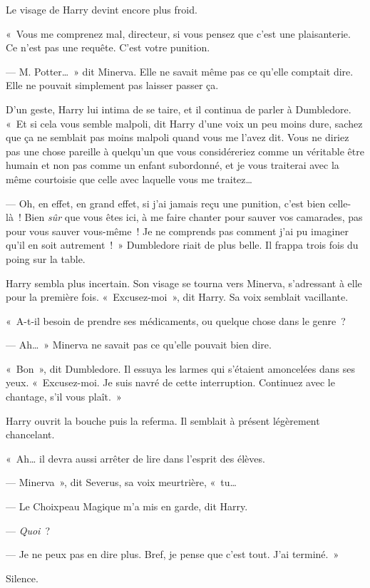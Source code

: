 Le visage de Harry devint encore plus froid.

«~Vous me comprenez mal, directeur, si vous pensez que c'est une plaisanterie.
Ce n'est pas une requête.
C'est votre punition.

--- M. Potter…~»
dit Minerva.
Elle ne savait même pas ce qu'elle comptait dire.
Elle ne pouvait simplement pas laisser passer ça.

D'un geste, Harry lui intima de se taire, et il continua de parler à Dumbledore.
«~Et si cela vous semble malpoli, dit Harry d’une voix un peu moins dure, sachez que ça ne semblait pas moins malpoli quand vous me l'avez dit.
Vous ne diriez pas une chose pareille à quelqu'un que vous considéreriez comme un véritable être humain et non pas comme un enfant subordonné, et je vous traiterai avec la même courtoisie que celle avec laquelle vous me traitez…

--- Oh, en effet, en grand effet, si j'ai jamais reçu une punition, c'est bien celle-là~!
Bien \emph{sûr} que vous êtes ici, à me faire chanter pour sauver vos camarades, pas pour vous sauver vous-même~!
Je ne comprends pas comment j'ai pu imaginer qu'il en soit autrement~!~»
Dumbledore riait de plus belle.
Il frappa trois fois du poing sur la table.

Harry sembla plus incertain.
Son visage se tourna vers Minerva, s'adressant à elle pour la première fois.
«~Excusez-moi~», dit Harry.
Sa voix semblait vacillante.

«~A-t-il besoin de prendre ses médicaments, ou quelque chose dans le genre~?

--- Ah…~» Minerva ne savait pas ce qu'elle pouvait bien dire.

«~Bon~», dit Dumbledore.
Il essuya les larmes qui s'étaient amoncelées dans ses yeux.
«~Excusez-moi.
Je suis navré de cette interruption.
Continuez avec le chantage, s'il vous plaît.~»

Harry ouvrit la bouche puis la referma.
Il semblait à présent légèrement chancelant.

«~Ah… il devra aussi arrêter de lire dans l'esprit des élèves.

--- Minerva~», dit Severus, sa voix meurtrière, «~tu…

--- Le Choixpeau Magique m'a mis en garde, dit Harry.

--- \emph{Quoi}~?

--- Je ne peux pas en dire plus.
Bref, je pense que c'est tout.
J'ai terminé.~»

Silence.

